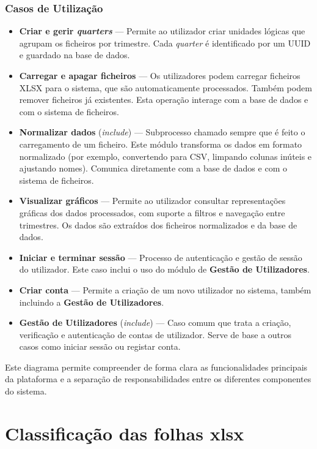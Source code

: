 \subsection*{Casos de Utilização}
\begin{itemize}
    \item \textbf{Criar e gerir \textit{quarters}} — Permite ao utilizador criar unidades lógicas que agrupam os ficheiros por trimestre. Cada \textit{quarter} é identificado por um UUID e guardado na base de dados.
    \item \textbf{Carregar e apagar ficheiros} — Os utilizadores podem carregar ficheiros XLSX para o sistema, que são automaticamente processados. Também podem remover ficheiros já existentes. Esta operação interage com a base de dados e com o sistema de ficheiros.
    \item \textbf{Normalizar dados} (\textit{include}) — Subprocesso chamado sempre que é feito o carregamento de um ficheiro. Este módulo transforma os dados em formato normalizado (por exemplo, convertendo para CSV, limpando colunas inúteis e ajustando nomes). Comunica diretamente com a base de dados e com o sistema de ficheiros.
    \item \textbf{Visualizar gráficos} — Permite ao utilizador consultar representações gráficas dos dados processados, com suporte a filtros e navegação entre trimestres. Os dados são extraídos dos ficheiros normalizados e da base de dados.
    \item \textbf{Iniciar e terminar sessão} — Processo de autenticação e gestão de sessão do utilizador. Este caso inclui o uso do módulo de \textbf{Gestão de Utilizadores}.
    \item \textbf{Criar conta} — Permite a criação de um novo utilizador no sistema, também incluindo a \textbf{Gestão de Utilizadores}.
    \item \textbf{Gestão de Utilizadores} (\textit{include}) — Caso comum que trata a criação, verificação e autenticação de contas de utilizador. Serve de base a outros casos como iniciar sessão ou registar conta.
\end{itemize}

Este diagrama permite compreender de forma clara as funcionalidades principais da plataforma e a separação de responsabilidades entre os diferentes componentes do sistema.

\chapter{Classificação das folhas \gls{xlsx}}


